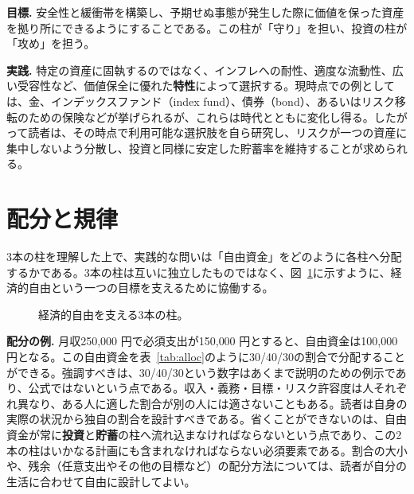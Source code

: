 \documentclass[11pt,a4paper,twocolumn]{article}
\begin{document}
\textbf{目標.} 安全性と緩衝帯を構築し、予期せぬ事態が発生した際に価値を保った資産を拠り所にできるようにすることである。この柱が「守り」を担い、投資の柱が「攻め」を担う。

\textbf{実践.} 特定の資産に固執するのではなく、インフレへの耐性、適度な流動性、広い受容性など、価値保全に優れた\textbf{特性}によって選択する。現時点での例としては、金、インデックスファンド（index fund）、債券（bond）、あるいはリスク移転のための保険などが挙げられるが、これらは時代とともに変化し得る。したがって読者は、その時点で利用可能な選択肢を自ら研究し、リスクが一つの資産に集中しないよう分散し、投資と同様に安定した貯蓄率を維持することが求められる。

\section{配分と規律}
3本の柱を理解した上で、実践的な問いは「自由資金」をどのように各柱へ分配するかである。3本の柱は互いに独立したものではなく、図~\ref{fig:pillars}に示すように、経済的自由という一つの目標を支えるために協働する。

\begin{figure}[t]
\centering
{}
\caption{経済的自由を支える3本の柱。}
\label{fig:pillars}
\end{figure}

\textbf{配分の例.} 月収250{,}000 円で必須支出が150{,}000 円とすると、自由資金は100{,}000 円となる。この自由資金を表~\ref{tab:alloc}のように30/40/30の割合で分配することができる。強調すべきは、30/40/30という数字はあくまで説明のための例示であり、公式ではないという点である。収入・義務・目標・リスク許容度は人それぞれ異なり、ある人に適した割合が別の人には適さないこともある。読者は自身の実際の状況から独自の割合を設計すべきである。省くことができないのは、自由資金が常に\textbf{投資}と\textbf{貯蓄}の柱へ流れ込まなければならないという点であり、この2本の柱はいかなる計画にも含まれなければならない必須要素である。割合の大小や、残余（任意支出やその他の目標など）の配分方法については、読者が自分の生活に合わせて自由に設計してよい。
\end{document}
